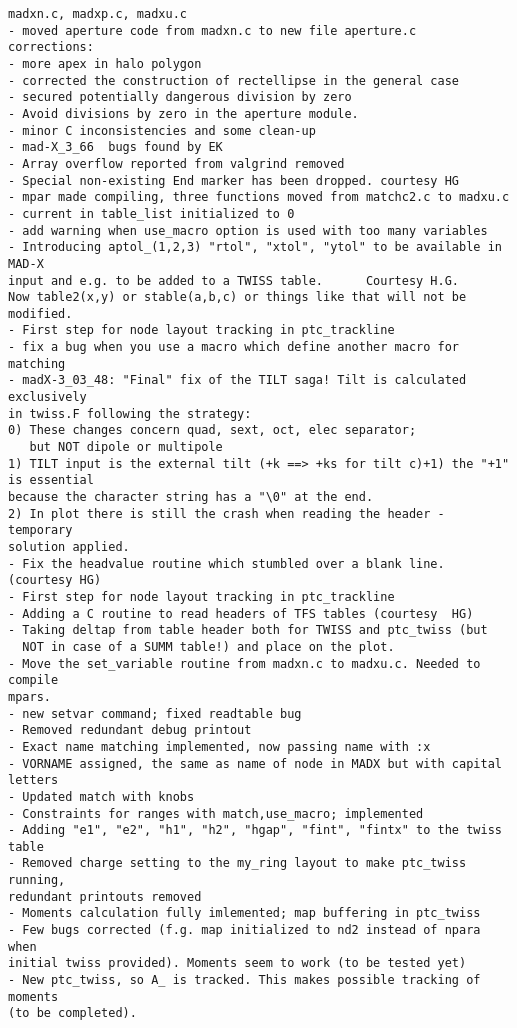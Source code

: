 \begin{verbatim}
madxn.c, madxp.c, madxu.c
- moved aperture code from madxn.c to new file aperture.c
corrections:
- more apex in halo polygon
- corrected the construction of rectellipse in the general case
- secured potentially dangerous division by zero
- Avoid divisions by zero in the aperture module.
- minor C inconsistencies and some clean-up
- mad-X_3_66  bugs found by EK
- Array overflow reported from valgrind removed
- Special non-existing End marker has been dropped. courtesy HG
- mpar made compiling, three functions moved from matchc2.c to madxu.c
- current in table_list initialized to 0
- add warning when use_macro option is used with too many variables
- Introducing aptol_(1,2,3) "rtol", "xtol", "ytol" to be available in MAD-X
input and e.g. to be added to a TWISS table.      Courtesy H.G.
Now table2(x,y) or stable(a,b,c) or things like that will not be modified.
- First step for node layout tracking in ptc_trackline
- fix a bug when you use a macro which define another macro for matching
- madX-3_03_48: "Final" fix of the TILT saga! Tilt is calculated exclusively
in twiss.F following the strategy:
0) These changes concern quad, sext, oct, elec separator;
   but NOT dipole or multipole
1) TILT input is the external tilt (+k ==> +ks for tilt c)+1) the "+1" is essential
because the character string has a "\0" at the end.
2) In plot there is still the crash when reading the header - temporary
solution applied.
- Fix the headvalue routine which stumbled over a blank line. (courtesy HG)
- First step for node layout tracking in ptc_trackline
- Adding a C routine to read headers of TFS tables (courtesy  HG)
- Taking deltap from table header both for TWISS and ptc_twiss (but
  NOT in case of a SUMM table!) and place on the plot.
- Move the set_variable routine from madxn.c to madxu.c. Needed to compile
mpars.
- new setvar command; fixed readtable bug
- Removed redundant debug printout
- Exact name matching implemented, now passing name with :x
- VORNAME assigned, the same as name of node in MADX but with capital letters
- Updated match with knobs
- Constraints for ranges with match,use_macro; implemented
- Adding "e1", "e2", "h1", "h2", "hgap", "fint", "fintx" to the twiss table
- Removed charge setting to the my_ring layout to make ptc_twiss running, 
redundant printouts removed
- Moments calculation fully imlemented; map buffering in ptc_twiss
- Few bugs corrected (f.g. map initialized to nd2 instead of npara when 
initial twiss provided). Moments seem to work (to be tested yet)
- New ptc_twiss, so A_ is tracked. This makes possible tracking of moments 
(to be completed).

\end{verbatim}
